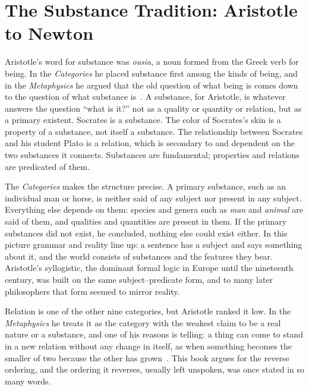 \section{The Substance Tradition: Aristotle to Newton}
\label{sec:ch2-substance}

Aristotle's word for substance was \emph{ousia}, a noun formed from the Greek verb for being. In the \textit{Categories} he placed substance first among the kinds of being, and in the \textit{Metaphysics} he argued that the old question of what being is comes down to the question of what substance is~\citep[Book~VII, ch.~1]{Aristotle_Metaphysics}. A substance, for Aristotle, is whatever answers the question ``what is it?'' not as a quality or quantity or relation, but as a primary existent. Socrates is a substance. The color of Socrates's skin is a property of a substance, not itself a substance. The relationship between Socrates and his student Plato is a relation, which is secondary to and dependent on the two substances it connects. Substances are fundamental; properties and relations are predicated of them.

The \textit{Categories} makes the structure precise. A primary substance, such as an individual man or horse, is neither said of any subject nor present in any subject. Everything else depends on them: species and genera such as \emph{man} and \emph{animal} are said of them, and qualities and quantities are present in them. If the primary substances did not exist, he concluded, nothing else could exist either. In this picture grammar and reality line up: a sentence has a subject and says something about it, and the world consists of substances and the features they bear. Aristotle's syllogistic, the dominant formal logic in Europe until the nineteenth century, was built on the same subject--predicate form, and to many later philosophers that form seemed to mirror reality.

Relation is one of the other nine categories, but Aristotle ranked it low. In the \textit{Metaphysics} he treats it as the category with the weakest claim to be a real nature or a substance, and one of his reasons is telling: a thing can come to stand in a new relation without any change in itself, as when something becomes the smaller of two because the other has grown~\citep[Book~XIV, ch.~1]{Aristotle_Metaphysics}. This book argues for the reverse ordering, and the ordering it reverses, usually left unspoken, was once stated in so many words.

